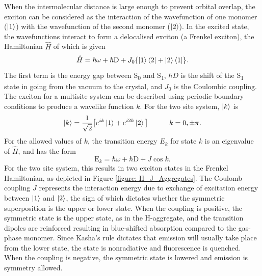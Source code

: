 When the intermolecular distance is large enough to prevent orbital overlap, the exciton can be considered as the interaction of the wavefunction of one monomer ($\ket{1}$) with the wavefunction of the second monomer ($\ket{2}$). In the excited state, the  wavefunctions interact to form a delocalised exciton (a Frenkel exciton), the Hamiltonian $\hat{H}$ of which is given
\begin{equation}
\hat{H}=\hbar\omega + \mathrm{\hbar{}D} + J_{0}\{\ket{1}\bra{2}+\ket{2}\bra{1}\}.
\end{equation}
The first term is the energy gap between S\textsubscript{0} and S\textsubscript{1},  $\hbar{}D$ is the shift of the S\textsubscript{1} state in going from the vacuum to the crystal, and $J_{0}$ is the Coulombic coupling.\cite{Spano} The exciton for a multisite system can be described using periodic boundary conditions to produce a wavelike function $k$. For the two site system, $\ket{k}$ is\cite{Hestand2018}
\begin{equation}
\ket{k}=\frac{1}{\sqrt{2}}\big[e^{ik}\ket{1}+  e^{i2k}\ket{2}\big]\qquad\quad k=0,\pm{\pi}.
\end{equation}
For the allowed values of $k$, the transition energy $E_k$ for state $k$ is an eigenvalue of $\hat{H}$, and has the form
\begin{equation}
\mathrm{E}_{k}=\hbar\omega + \mathrm{\hbar{}D} +J\cos{k}.
\end{equation}
For the two site system, this results in two exciton states in the Frenkel Hamiltonian, as depicted in Figure \ref{figure: H_J_Aggregates}. The Coulomb coupling $J$ represents the interaction energy due to exchange of excitation energy between $\ket{1}$ and $\ket{2}$, the sign of which dictates whether the symmetric superposition is the upper or lower state. When the coupling is positive, the symmetric state is the upper state, as in the H-aggregate, and the transition dipoles are reinforced resulting in blue-shifted absorption compared to the gas-phase monomer. Since Kasha's rule dictates that emission will usually take place from the lower state, the state is nonradiative and fluorescence is quenched.\cite{Kasha1950} When the coupling is negative, the symmetric state is lowered and emission is symmetry allowed.\cite{Hestand2017}
